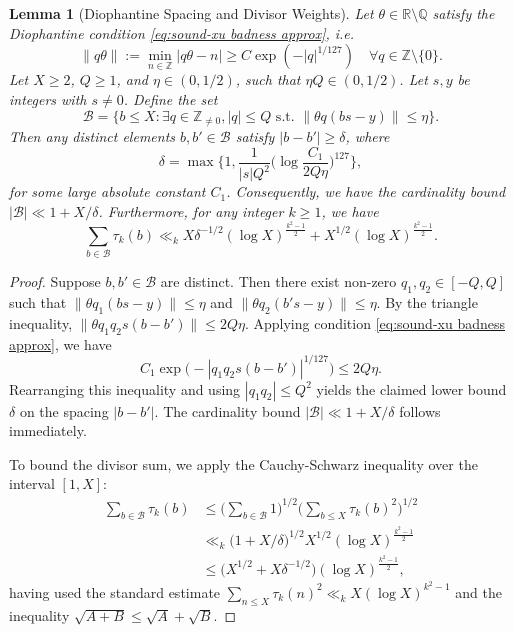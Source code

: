 \documentclass[12pt]{amsart}
\renewcommand{\le}{\leqslant}
\renewcommand{\ge}{\geqslant}
\renewcommand{\geq}{\geqslant}
\numberwithin{equation}{section}
\theoremstyle{plain}
\newtheorem{lem}[thm]{Lemma}
\theoremstyle{definition}
\newcommand{\Z}{\mathbb{Z}}
\newcommand{\Q}{\mathbb{Q}}
\newcommand{\R}{\mathbb{R}}
\begin{document}
	\begin{lem}[Diophantine Spacing and Divisor Weights]\label{lem: badness spacing}
		Let $\theta \in \R \setminus \Q$ satisfy the Diophantine condition \eqref{eq:sound-xu badness approx}, i.e. 
		$$	\|q\theta\|:= \min_{n \in \Z}|q \theta -n |\geq C\exp(-|q|^{1/127}) \quad \forall q \in \Z \setminus \{0\}.$$
		Let $X \ge 2$, $Q \ge 1$, and $\eta \in (0, 1/2)$, such that $\eta Q \in (0,1/2)$. Let $s, y$ be integers with $s \ne 0$. Define the set
		$$ \mathcal{B} = \Big\{ b \le X : \exists q \in \Z_{\ne 0}, |q| \le Q \text{ s.t. } \|\theta q(b s - y)\| \le \eta \Big\}. $$
		Then any distinct elements $b, b' \in \mathcal{B}$ satisfy $|b - b'| \ge \delta$, where
		$$ \delta = \max\bigg\{1,\frac{1}{|s| Q^2} \bigg( \log \frac{C_1}{2 Q \eta} \bigg)^{127} \bigg \}, $$
		for some large absolute constant $C_1$. Consequently, we have the cardinality bound $|\mathcal{B}| \ll 1 + X/\delta$. Furthermore, for any integer $k \ge 1$, we have
		$$ \sum_{b \in \mathcal{B}} \tau_k(b) \ll_k X \delta^{-1/2} (\log X)^{\frac{k^2-1}{2}} + X^{1/2} (\log X)^{\frac{k^2-1}{2}}. $$
	\end{lem}
	\begin{proof}
		Suppose $b, b' \in \mathcal{B}$ are distinct. Then there exist non-zero $q_1, q_2 \in [-Q, Q]$ such that $\|\theta q_1(bs - y)\| \le \eta$ and $\|\theta q_2(b's - y)\| \le \eta$. By the triangle inequality, $\|\theta q_1 q_2 s (b - b')\| \le 2Q\eta$. Applying condition \eqref{eq:sound-xu badness approx}, we have
		$$ C_1 \exp\big(-|q_1 q_2 s (b - b')|^{1/127}\big) \le 2Q\eta. $$
		Rearranging this inequality and using $|q_1 q_2| \le Q^2$ yields the claimed lower bound $\delta$ on the spacing $|b - b'|$. The cardinality bound $|\mathcal{B}| \ll 1 + X/\delta$ follows immediately. 
		
		To bound the divisor sum, we apply the Cauchy-Schwarz inequality over the interval $[1, X]$:
		\begin{align*}
			\sum_{b \in \mathcal{B}} \tau_k(b) &\le \bigg( \sum_{b \in \mathcal{B}} 1 \bigg)^{1/2} \bigg( \sum_{b \le X} \tau_k(b)^2 \bigg)^{1/2} \\
			&\ll_k \big( 1 + X/\delta \big)^{1/2} X^{1/2} (\log X)^{\frac{k^2-1}{2}} \\
			&\le \big( X^{1/2} + X \delta^{-1/2} \big) (\log X)^{\frac{k^2-1}{2}},
		\end{align*}
		having used the standard estimate $\sum_{n \le X} \tau_k(n)^2 \ll_k X (\log X)^{k^2-1}$ and the inequality $\sqrt{A+B} \le \sqrt{A} + \sqrt{B}$.
	\end{proof}
	
\end{document}
